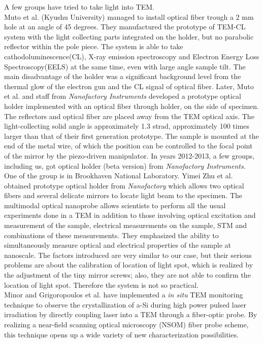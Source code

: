 A few groups have tried to take light into TEM. \\

Muto et al. (Kyushu University) managed to install optical fiber trough a 2 mm hole at an angle of 45 degrees.\cite{Tanabe2002,Furumoto2013} They manufactured the prototype of TEM-CL system with the light collecting parts integrated on the holder, but no parabolic reflector within the pole piece. The system is able to take cathodoluminescence(CL), X-ray emission spectroscopy and Electron Energy Loss Spectroscopy(EELS) at the same time, even with large angle sample tilt. The main disadvantage of the holder was a significant background level from the thermal glow of the electron gun and the CL signal of optical fiber. Later, Muto et al. and staff from {\em Nanofactory Instruments} developed a prototype optical holder implemented with an optical fiber through holder, on the side of specimen. The reflectors and optical fiber are placed away from the TEM optical axis. The light-collecting solid angle is approximately 1.3 strad, approximately 100 times larger than that of their first generation prototype. The sample is mounted at the end of the metal wire, of which the position can be controlled to the focal point of the mirror by the piezo-driven manipulator. In years 2012-2013, a few groups, including us, got optical holder (beta version) from {\em Nanofactory Instruments}. \\

One of the group is in Brookhaven National Laboratory. Yimei Zhu et al. obtained prototype optical holder from {\em Nanofactory} which allows two optical fibers and several delicate mirrors to locate light beam to the specimen. 
The multimodal optical nanoprobe allows scientists to perform all the usual experiments done in a TEM in addition to those involving optical excitation and measurement of the sample, electrical measurements on the sample, STM and combinations of these measurements. They emphasized the ability to simultaneously measure optical and electrical properties of the sample at nanoscale.\cite{Zhu2012Multimodal}  The factors introduced are very similar to our case, but their serious problems are about the calibration of location of light spot, which is realized by the adjustment of the tiny mirror screws; also, they are not able to confirm the location of light spot. Therefore the system is not so practical. \\

Minor and Grigoropoulos et al. have implemented a {\em in situ} TEM monitoring technique to observe the crystallization of a-Si during high power pulsed laser irradiation by directly coupling laser into a TEM through a fiber-optic probe. By realizing a near-field
scanning optical microscopy (NSOM) fiber probe scheme, this technique opens up a wide variety of new characterization possibilities.\cite{Xiang2012}


